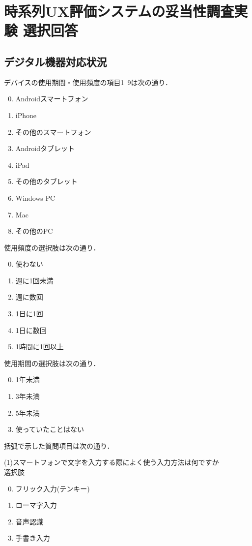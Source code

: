 \chapter{時系列UX評価システムの妥当性調査実験 選択回答}

\section{デジタル機器対応状況}

デバイスの使用期間・使用頻度の項目1~9は次の通り．

\begin{enumerate}
\setcounter{enumi}{-1}
  \item Androidスマートフォン
  \item iPhone
  \item その他のスマートフォン
  \item Androidタブレット
  \item iPad
  \item その他のタブレット
  \item Windows PC
  \item Mac
  \item その他のPC
\end{enumerate}

使用頻度の選択肢は次の通り．

\begin{enumerate}
\setcounter{enumi}{-1}
  \item 使わない
  \item 週に1回未満
  \item 週に数回
  \item 1日に1回
  \item 1日に数回
  \item 1時間に1回以上
\end{enumerate}

使用期間の選択肢は次の通り．

\begin{enumerate}
\setcounter{enumi}{-1}
  \item 1年未満
  \item 3年未満
  \item 5年未満
  \item 使っていたことはない
\end{enumerate}

括弧で示した質問項目は次の通り．

(1)スマートフォンで文字を入力する際によく使う入力方法は何ですか\\
  選択肢
  \begin{enumerate}
  \setcounter{enumi}{-1}
  \item フリック入力(テンキー)
  \item ローマ字入力
  \item 音声認識
  \item 手書き入力
\end{enumerate}

